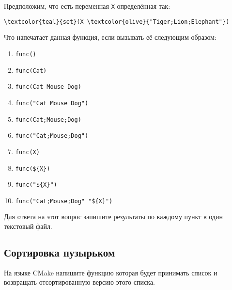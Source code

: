 \documentclass{article}
\begin{document}
Предположим, что есть переменная \texttt{X} определённая так:
\begin{Verbatim}[commandchars=\\\{\}]
\textcolor{teal}{set}(X \textcolor{olive}{"Tiger;Lion;Elephant"})
\end{Verbatim}
Что напечатает данная функция, если вызывать её следующим образом:

\begin{enumerate}
\item \texttt{func()}
\item \texttt{func(Cat)}
\item \texttt{func(Cat Mouse Dog)}
\item \texttt{func("Cat Mouse Dog")}
\item \texttt{func(Cat;Mouse;Dog)}
\item \texttt{func("Cat;Mouse;Dog")}
\item \texttt{func(X)}
\item \texttt{func(\$\{X\})}
\item \texttt{func("\$\{X\}")}
\item \texttt{func("Cat;Mouse;Dog" {} "\$\{X\}")}
\end{enumerate}

Для ответа на этот вопрос запишите результаты по каждому пункт в один текстовый файл.


\subsection{Сортировка пузырьком}
На языке CMake напишите функцию которая будет принимать список и возвращать отсортированную версию этого списка.
\end{document}
